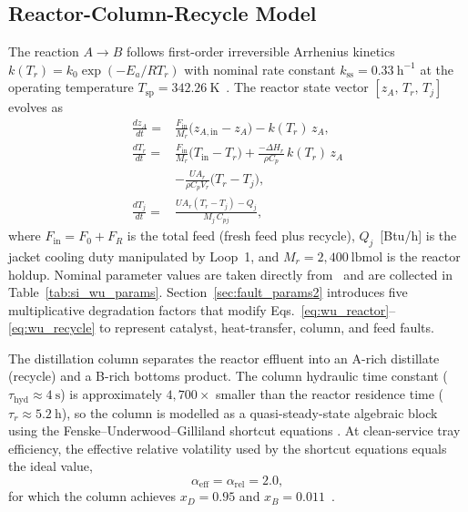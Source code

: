 \documentclass[aps,pre,twocolumn,superscriptaddress]{revtex4-2}
\begin{document}
\subsection{Reactor-Column-Recycle Model}

The reaction $A \to B$ follows first-order irreversible Arrhenius kinetics $k(T_r) = k_0\exp(-E_a/RT_r)$ with nominal rate constant $k_\mathrm{ss} = 0.33~\mathrm{h}^{-1}$ at the operating temperature $T_\mathrm{sp} = 342.26~\mathrm{K}$~\citep{Wu2003}. The reactor state vector $[z_A,\,T_r,\,T_j]$ evolves as
%
\begin{subequations}
\label{eq:wu_reactor}
\begin{align}
  \frac{dz_A}{dt}
    =& \frac{F_\mathrm{in}}{M_r}\bigl(z_{A,\mathrm{in}} - z_A\bigr)
       - k(T_r)\,z_A,
  \label{eq:wu_dza} \\[4pt]
  \frac{dT_r}{dt}
    =& \frac{F_\mathrm{in}}{M_r}\bigl(T_\mathrm{in} - T_r\bigr)
       + \frac{-\Delta H_r}{\rho C_p}\,k(T_r)\,z_A \\ \nonumber
    & - \frac{U\!A_r}{\rho C_p V_r}\bigl(T_r - T_j\bigr),
  \label{eq:wu_dtr} \\[4pt]
  \frac{dT_j}{dt}
    =& \frac{U\!A_r(T_r - T_j) - Q_j}{M_j\,C_{pj}},
  \label{eq:wu_dtj}
\end{align}
\end{subequations}
%
where $F_\mathrm{in} = F_0 + F_R$ is the total feed (fresh feed plus recycle), $Q_j$~[Btu/h] is the jacket cooling duty manipulated by Loop~1, and $M_r = 2{,}400~\mathrm{lbmol}$ is the reactor holdup. Nominal parameter values are taken directly from~\citet[Table~1]{Wu2003} and are collected in Table~\ref{tab:si_wu_params}. Section~\ref{sec:fault_params2} introduces five multiplicative degradation factors that modify Eqs.~\eqref{eq:wu_reactor}--\eqref{eq:wu_recycle} to represent catalyst, heat-transfer, column, and feed faults.

The distillation column separates the reactor effluent into an A-rich distillate (recycle) and a B-rich bottoms product. The column hydraulic time constant ($\tau_\mathrm{hyd} \approx 4~\mathrm{s}$) is approximately $4{,}700\times$ smaller than the reactor residence time ($\tau_r \approx 5.2~\mathrm{h}$), so the column is modelled as a quasi-steady-state algebraic block using the Fenske--Underwood--Gilliland shortcut equations \citep{FUG_1991}.   At clean-service tray efficiency, the effective relative volatility used by the shortcut equations equals the ideal value,
%
\begin{equation}
  \alpha_\mathrm{eff} = \alpha_\mathrm{rel} = 2.0,
  \label{eq:wu_alphaeff}
\end{equation}
%
for which the column achieves $x_D = 0.95$ and $x_B = 0.011$~\citep{Wu2003}.
\end{document}
